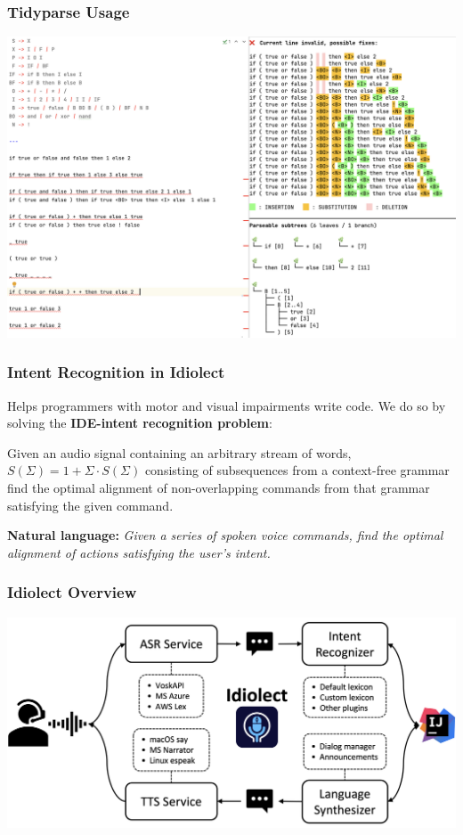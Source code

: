 \documentclass[mathserif,notheorems]{beamer}
\theoremstyle{plain} %
\theoremstyle{definition} %
\begin{document}
\begin{frame}
  \frametitle{Tidyparse Usage}
  \includegraphics[scale=0.25]{tidyparse_screenshot}
\end{frame}

\begin{frame}
  \frametitle{Intent Recognition in Idiolect}
  Helps programmers with motor and visual impairments write code. We do so by solving the \textbf{IDE-intent recognition problem}:\vspace{10pt}

  Given an audio signal containing an arbitrary stream of words, $S(\Sigma) = 1 + \Sigma\cdot S(\Sigma)$ consisting of subsequences from a context-free grammar find the optimal alignment of non-overlapping commands from that grammar satisfying the given command.\vspace{10pt}

  \textbf{Natural language:}
  \textit{Given a series of spoken voice commands, find the optimal alignment of actions satisfying the user's intent.}

\end{frame}

\begin{frame}
  \frametitle{Idiolect Overview}
  \includegraphics[scale=0.185]{idiolect_overview}
\end{frame}
\end{document}
